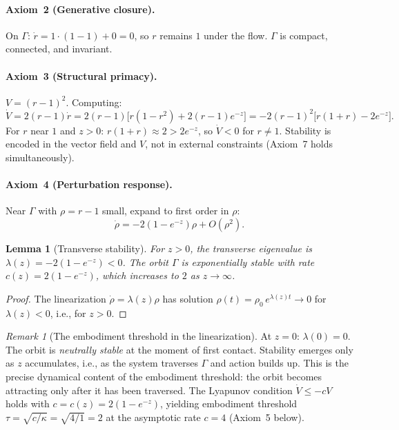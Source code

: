 \documentclass[12pt, oneside]{book}
\theoremstyle{plain}
\newtheorem{lemma}[theorem]{Lemma}
\theoremstyle{definition}
\theoremstyle{remark}
\newtheorem{remark}{Remark}[section]
\newcommand{\Orb}{\Gamma}
\begin{document}
\paragraph{Axiom~2 (Generative closure).}
On $\Orb$: $\dot r = 1\cdot(1-1) + 0 = 0$, so $r$ remains $1$
under the flow. $\Orb$ is compact, connected, and invariant.

\paragraph{Axiom~3 (Structural primacy).}
$V=(r-1)^2$. Computing:
\[
  \dot V = 2(r-1)\dot r
  = 2(r-1)\bigl[r(1-r^2) + 2(r-1)e^{-z}\bigr]
  = -2(r-1)^2\bigl[r(1+r) - 2e^{-z}\bigr].
\]
For $r$ near $1$ and $z>0$: $r(1+r)\approx 2 > 2e^{-z}$, so
$\dot V < 0$ for $r\ne 1$. Stability is encoded in the vector
field and $V$, not in external constraints (Axiom~7 holds
simultaneously).

\paragraph{Axiom~4 (Perturbation response).}
Near $\Orb$ with $\rho=r-1$ small, expand to first order in $\rho$:
\[
  \dot\rho = -2(1-e^{-z})\rho + O(\rho^2).
\]

\begin{lemma}[Transverse stability]\label{lem:transverse}
For $z>0$, the transverse eigenvalue is
$\lambda(z) = -2(1-e^{-z}) < 0$.
The orbit $\Orb$ is exponentially stable with rate
$c(z) = 2(1-e^{-z})$, which increases to $2$ as $z\to\infty$.
\end{lemma}
\begin{proof}
The linearization $\dot\rho = \lambda(z)\rho$ has solution
$\rho(t) = \rho_0\,e^{\lambda(z)t}\to 0$ for $\lambda(z)<0$,
i.e., for $z>0$.
\end{proof}

\begin{remark}[The embodiment threshold in the linearization]
At $z=0$: $\lambda(0) = 0$. The orbit is \emph{neutrally stable}
at the moment of first contact. Stability emerges only as $z$
accumulates, i.e., as the system traverses $\Orb$ and action
builds up. This is the precise dynamical content of the embodiment
threshold: the orbit becomes attracting only after it has been
traversed. The Lyapunov condition $\dot V\le -cV$ holds with
$c = c(z) = 2(1-e^{-z})$, yielding embodiment threshold
$\tau = \sqrt{c/\kappa} = \sqrt{4/1} = 2$ at the asymptotic
rate $c=4$ (Axiom~5 below).
\end{remark}
\end{document}
